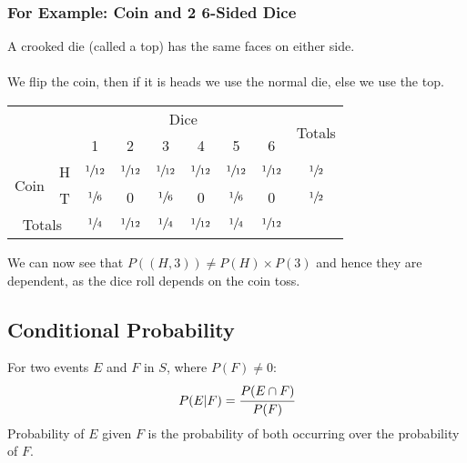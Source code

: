 \documentclass{report}
\begin{document}
            \subsubsection*{For Example: Coin and 2 6-Sided Dice}
                A crooked die (called a top) has the same faces on either side.
                \\
                \\ We flip the coin, then if it is heads we use the normal die, else we use the top.
                \begin{center}
                    \begin{tabular}{c c c c c c c c c}
                        \setlength{\tabcolsep}{3em}
                        & & \multicolumn{6}{c}{Dice} & \multirow{2}{*}{Totals} \\
                                            &     & 1               & 2               & 3               & 4               & 5               & 6                 &                 \\
                        \multirow{2}{*}{Coin} & H   & $\sfrac{1}{12}$ & $\sfrac{1}{12}$ & $\sfrac{1}{12}$ & $\sfrac{1}{12}$ & $\sfrac{1}{12}$ & $\sfrac{1}{12}$ & $\sfrac{1}{2}$  \\
                                              & T   & $\sfrac{1}{6}$  & $0$             & $\sfrac{1}{6}$  & $0$             & $\sfrac{1}{6}$  & $0$             &  $\sfrac{1}{2}$ \\
                        \multicolumn{2}{c}{Totals}  & $\sfrac{1}{4}$  & $\sfrac{1}{12}$ & $\sfrac{1}{4}$  & $\sfrac{1}{12}$ & $\sfrac{1}{4}$  & $\sfrac{1}{12}$ &                 \\
                    \end{tabular}
                \end{center}
                We can now see that $P({(H,3)}) \neq P({H}) \times P({3})$ and hence they are dependent, as the dice roll depends on the coin toss.

        \subsection*{Conditional Probability}
            For two events $E$ and $F$ in  $S$, where $P(F) \neq 0$:
            \[P(E|F) = \cfrac{P(E \cap F)}{P(F)}\]
            Probability of $E$ given $F$ is the probability of both occurring over the probability of $F$.
\end{document}
